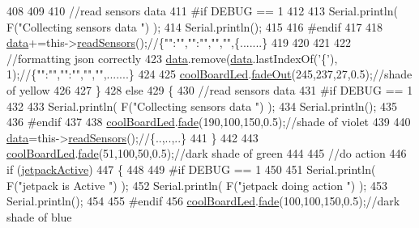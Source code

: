 \begin{DoxyCode}
408         
409                 
410         \textcolor{comment}{//read sensors data}
411 \textcolor{preprocessor}{    #if DEBUG == 1}
412 
413         Serial.println( F(\textcolor{stringliteral}{"Collecting sensors data "}) );
414         Serial.println();
415 
416 \textcolor{preprocessor}{    #endif}
417 
418         \hyperlink{classCoolBoard_a427fb753dd8575bdf821c70a5c63d695}{data}+=this->\hyperlink{classCoolBoard_ad03abdce2e65f520bbf2cff0f2d083cf}{readSensors}();\textcolor{comment}{//\{"":"","":"","","",\{.......\}}
419 
420         
421 
422         \textcolor{comment}{//formatting json correctly}
423         \hyperlink{classCoolBoard_a427fb753dd8575bdf821c70a5c63d695}{data}.remove(\hyperlink{classCoolBoard_a427fb753dd8575bdf821c70a5c63d695}{data}.lastIndexOf(\textcolor{charliteral}{'\{'}), 1);\textcolor{comment}{//\{"":"","":"","","",.......\}}
424 
425         \hyperlink{classCoolBoard_a1b1d3c684a5baa56b08486e192fd8e97}{coolBoardLed}.\hyperlink{classCoolBoardLed_a93d545679237e8cc858324367149775c}{fadeOut}(245,237,27,0.5);\textcolor{comment}{//shade of yellow}
426                 
427     \}   
428     \textcolor{keywordflow}{else}
429     \{
430         \textcolor{comment}{//read sensors data}
431 \textcolor{preprocessor}{    #if DEBUG == 1}
432 
433         Serial.println( F(\textcolor{stringliteral}{"Collecting sensors data "}) );
434         Serial.println();
435 
436 \textcolor{preprocessor}{    #endif}
437 
438         \hyperlink{classCoolBoard_a1b1d3c684a5baa56b08486e192fd8e97}{coolBoardLed}.\hyperlink{classCoolBoardLed_af1cacbaa88db8bcf6042c1083ba41155}{fade}(190,100,150,0.5);\textcolor{comment}{//shade of violet        }
439 
440         \hyperlink{classCoolBoard_a427fb753dd8575bdf821c70a5c63d695}{data}=this->\hyperlink{classCoolBoard_ad03abdce2e65f520bbf2cff0f2d083cf}{readSensors}();\textcolor{comment}{//\{..,..,..\}}
441     \}
442 
443     \hyperlink{classCoolBoard_a1b1d3c684a5baa56b08486e192fd8e97}{coolBoardLed}.\hyperlink{classCoolBoardLed_af1cacbaa88db8bcf6042c1083ba41155}{fade}(51,100,50,0.5);\textcolor{comment}{//dark shade of green  }
444 
445     \textcolor{comment}{//do action}
446     \textcolor{keywordflow}{if} (\hyperlink{classCoolBoard_a9be03a913d26e558328935ca3b59a75e}{jetpackActive})
447     \{
448 
449 \textcolor{preprocessor}{    #if DEBUG == 1}
450 
451         Serial.println( F(\textcolor{stringliteral}{"jetpack is Active "}) );
452         Serial.println( F(\textcolor{stringliteral}{"jetpack doing action "}) );
453         Serial.println();
454     
455 \textcolor{preprocessor}{    #endif}
456         \hyperlink{classCoolBoard_a1b1d3c684a5baa56b08486e192fd8e97}{coolBoardLed}.\hyperlink{classCoolBoardLed_af1cacbaa88db8bcf6042c1083ba41155}{fade}(100,100,150,0.5);\textcolor{comment}{//dark shade of blue }

\end{DoxyCode}
